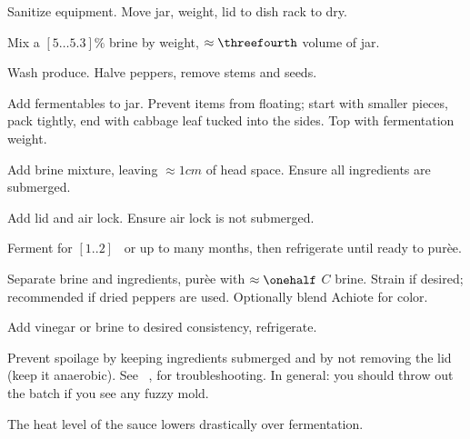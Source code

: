 \begin{preparation}
\item Sanitize equipment.
    Move jar, weight, lid to dish rack to dry.

\item Mix a $[5 \dots 5.3]\%$ brine by weight, $\approx\threefourth$ volume of jar.

\item Wash produce.
    Halve peppers, remove stems and seeds.

\item Add fermentables to jar.
    Prevent items from floating; start with smaller pieces, pack tightly, end with cabbage leaf tucked into the sides.
    Top with fermentation weight.

\item Add brine mixture, leaving $\approx1cm$ of head space.
    Ensure all ingredients are submerged.

\item Add lid and air lock.
    Ensure air lock is not submerged.

\item Ferment for $[1..2]$ \week~or up to many months, then refrigerate until ready to pur\`{e}e.

\item Separate brine and ingredients, pur\`{e}e with $\approx\onehalf$ $C$ brine.
    Strain if desired; recommended if dried peppers are used.
    Optionally blend Achiote for color.

\item Add vinegar or brine to desired consistency, refrigerate.
\end{preparation}

\begin{experiments}
\item Prevent spoilage by keeping ingredients submerged and by not removing the lid (keep it anaerobic).
    See ~\cite{fieryferments2017},
    for troubleshooting.
    In general: you should throw out the batch if you see any fuzzy mold.
\item The heat level of the sauce lowers drastically over fermentation.
\end{experiments}

\recipeend%
